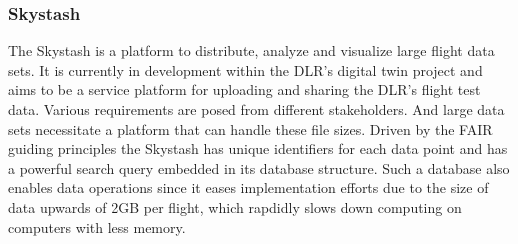 
\subsubsection{Skystash}
\label{chap:skystash}
The Skystash is a platform to distribute, analyze and visualize large flight data sets. It is currently in development within the DLR's digital twin project and aims to be a service platform for uploading and sharing the DLR's flight test data. Various requirements are posed from different stakeholders. And large data sets necessitate a platform that can handle these file sizes. Driven by the FAIR guiding principles the Skystash has unique identifiers for each data point and has a powerful search query embedded in its database structure. Such a database also enables data operations since it eases implementation efforts due to the size of data upwards of 2GB per flight, which rapdidly slows down computing on computers with less memory.



